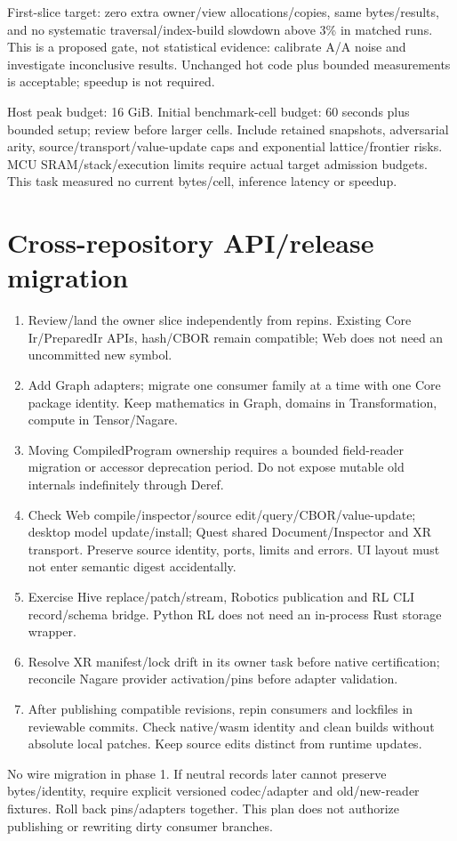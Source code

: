 \documentclass[10pt,a4paper]{article}
\begin{document}
First-slice target: zero extra owner/view allocations/copies, same bytes/results, and no systematic traversal/index-build slowdown above 3\% in matched runs. This is a proposed gate, not statistical evidence: calibrate A/A noise and investigate inconclusive results. Unchanged hot code plus bounded measurements is acceptable; speedup is not required.

Host peak budget: 16 GiB. Initial benchmark-cell budget: 60 seconds plus bounded setup; review before larger cells. Include retained snapshots, adversarial arity, source/transport/value-update caps and exponential lattice/frontier risks. MCU SRAM/stack/execution limits require actual target admission budgets. This task measured no current bytes/cell, inference latency or speedup.

\section{Cross-repository API/release migration}
\label{sec:clients}
\begin{enumerate}
\item Review/land the owner slice independently from repins. Existing Core Ir/PreparedIr APIs, hash/CBOR remain compatible; Web does not need an uncommitted new symbol.
\item Add Graph adapters; migrate one consumer family at a time with one Core package identity. Keep mathematics in Graph, domains in Transformation, compute in Tensor/Nagare.
\item Moving CompiledProgram ownership requires a bounded field-reader migration or accessor deprecation period. Do not expose mutable old internals indefinitely through Deref.
\item Check Web compile/inspector/source edit/query/CBOR/value-update; desktop model update/install; Quest shared Document/Inspector and XR transport. Preserve source identity, ports, limits and errors. UI layout must not enter semantic digest accidentally.
\item Exercise Hive replace/patch/stream, Robotics publication and RL CLI record/schema bridge. Python RL does not need an in-process Rust storage wrapper.
\item Resolve XR manifest/lock drift in its owner task before native certification; reconcile Nagare provider activation/pins before adapter validation.
\item After publishing compatible revisions, repin consumers and lockfiles in reviewable commits. Check native/wasm identity and clean builds without absolute local patches. Keep source edits distinct from runtime updates.
\end{enumerate}
No wire migration in phase 1. If neutral records later cannot preserve bytes/identity, require explicit versioned codec/adapter and old/new-reader fixtures. Roll back pins/adapters together. This plan does not authorize publishing or rewriting dirty consumer branches.
\end{document}
